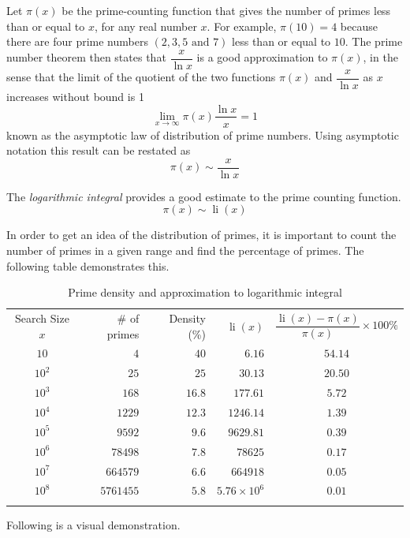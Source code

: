 Let $\pi(x)$ be the prime-counting function that gives the number of primes less than or equal to $x$, for any real number $x$. For example, $\pi(10) = 4$ because there are four prime numbers $(2, 3, 5 \text{ and } 7)$ less than or equal to $10$. The prime number theorem then states that $\dfrac{x}{\ln x}$ is a good approximation to $\pi(x)$, in the sense that the limit of the quotient of the two functions $\pi(x)$ and $\dfrac{x}{\ln x}$ as $x$ increases without bound is 1 $$\lim_{x\to\infty}\pi(x)\dfrac{\ln x}{x}=1$$ known as the asymptotic law of distribution of prime numbers. Using asymptotic notation this result can be restated as $$\pi(x)\sim\dfrac{x}{\ln x}$$

The \textit{logarithmic integral} provides a good estimate to the prime counting function.$$\pi(x)\sim \operatorname{li}(x)$$

In order to get an idea of the distribution of primes, it is important to count the number of primes in a given range and find the percentage of primes. The following table demonstrates this.

\begin{table}[htbp!]
\caption{Prime density and approximation to logarithmic integral}
\label{tab:1}       %
\centering
\begin{tabular}{c|r|r|r|c}
\hline\noalign{\smallskip}
Search Size $x$& \# of primes & Density (\%) & $\operatorname{li}(x)$ & $\dfrac{\operatorname{li}(x)-\pi(x)}{\pi(x)}\times 100\%$\\
\noalign{\smallskip}\hline\noalign{\smallskip}
$10$ & $4$ & $40$ & $6.16$ & $54.14$\\
$10^2$ & $25$ & $25$ & $30.13$ & $20.50$\\
$10^3$ & $168$ & $16.8$ & $177.61$ & $5.72$\\
$10^4$ & $1229$ & $12.3$ & $1246.14$ & $1.39$\\
$10^5$ & $9592$ & $9.6$ & $9629.81$ & $0.39$\\
$10^6$ & $78498$ & $7.8$ & $78625$ & $0.17$\\
$10^7$ & $664579$ & $6.6$ & $664918$ & $0.05$\\
$10^8$ & $5761455$ & $5.8$ & $5.76\times 10^6$ & $0.01$\\
\noalign{\smallskip}\hline
\end{tabular}
\end{table}

\FloatBarrier
Following is a visual demonstration.

